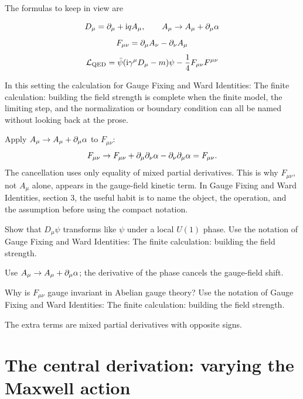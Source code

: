 The formulas to keep in view are

\[
  D_\mu=\partial_\mu+\mathrm i qA_\mu,\qquad A_\mu\to A_\mu+\partial_\mu\alpha
\]
\[
  F_{\mu\nu}=\partial_\mu A_\nu-\partial_\nu A_\mu
\]
\[
  \mathcal L_{\mathrm{QED}}=\bar\psi(\mathrm i\gamma^\mu D_\mu-m)\psi-\frac14F_{\mu\nu}F^{\mu\nu}
\]

In this setting the calculation for Gauge Fixing and Ward Identities: The finite calculation: building the field strength is complete when the finite model, the limiting step, and the normalization or boundary condition can all be named without looking back at the prose.




\begin{example}
Apply \(A_\mu\to A_\mu+\partial_\mu\alpha\) to \(F_{\mu\nu}\):
\[
  F_{\mu\nu}\to F_{\mu\nu}+\partial_\mu\partial_\nu\alpha-\partial_\nu\partial_\mu\alpha=F_{\mu\nu}.
\]
The cancellation uses only equality of mixed partial derivatives.  This is why \(F_{\mu\nu}\), not \(A_\mu\) alone, appears in the gauge-field kinetic term.  In Gauge Fixing and Ward Identities, section 3, the useful habit is to name the object, the operation, and the assumption before using the compact notation.
\end{example}



\begin{exercise}
Show that \(D_\mu\psi\) transforms like \(\psi\) under a local \(U(1)\) phase.  Use the notation of Gauge Fixing and Ward Identities: The finite calculation: building the field strength.
\begin{answer}
Use \(A_\mu\to A_\mu+\partial_\mu\alpha\); the derivative of the phase cancels the gauge-field shift.
\end{answer}
\end{exercise}

\begin{exercise}
Why is \(F_{\mu\nu}\) gauge invariant in Abelian gauge theory?  Use the notation of Gauge Fixing and Ward Identities: The finite calculation: building the field strength.
\begin{answer}
The extra terms are mixed partial derivatives with opposite signs.
\end{answer}
\end{exercise}



\section{The central derivation: varying the Maxwell action}

